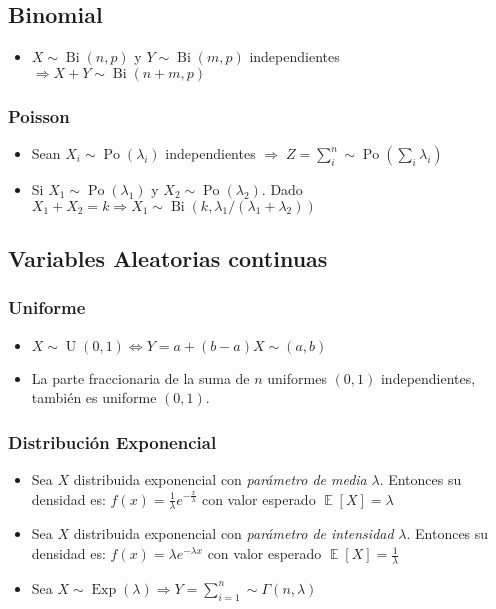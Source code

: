 \documentclass[pdftex,11pt,a4paper]{article}
\DeclareMathOperator{\E}{\mathbb{E}}
\DeclareMathOperator{\Po}{Po}
\DeclareMathOperator{\Bi}{Bi}
\DeclareMathOperator{\U}{U}
\DeclareMathOperator{\Exp}{Exp}
\begin{document}
\subsection{Binomial}
\begin{itemize}
	 \item $X\sim \Bi(n,p)$ y $Y \sim \Bi(m,p)$ independientes $\Rightarrow X+Y \sim \Bi(n+m,p)$
\end{itemize}

\subsubsection{Poisson}
\begin{itemize}
	\item Sean $X_i \sim \Po(\lambda_i)$ independientes $\Rightarrow \; Z = \sum_i^n \sim \Po(\sum_i \lambda_i)$ 
	\item Si $X_1 \sim \Po(\lambda_1)$ y $X_2 \sim \Po(\lambda_2)$. Dado $X_1 + X_2 = k \Rightarrow X_1 \sim \Bi(k, \lambda_1/(\lambda_1 + \lambda_2))$
\end{itemize}
\subsection{Variables Aleatorias continuas}
\subsubsection{Uniforme}
	\begin{itemize}
		\item $X \sim \U(0,1) \iff Y = a + (b-a)X \sim(a,b)$
		\item La parte fraccionaria de la suma de $n$ uniformes $(0,1)$ independientes, también es uniforme $(0,1)$.
	\end{itemize}
\subsubsection{Distribución Exponencial}
	\begin{itemize}
		\item Sea $X$ distribuida exponencial con \emph{parámetro de media} $\lambda$. Entonces su densidad es: $f(x) = \frac{1}{\lambda}e^{-\frac{x}{\lambda}}$ con valor esperado $\E[X] = \lambda$
		\item Sea $X$ distribuida exponencial con \emph{parámetro de intensidad} $\lambda$. Entonces su densidad es: $f(x) = \lambda e^{-\lambda x}$ con valor esperado $\E[X] = \frac{1}{\lambda}$
		\item Sea $X \sim \Exp(\lambda) \Rightarrow Y = \sum_{i = 1}^n \sim \Gamma(n,\lambda)$
	\end{itemize}
	
\end{document}
